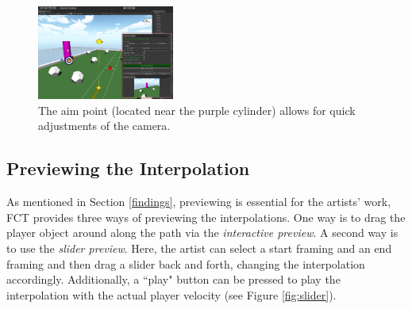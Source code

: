 
\begin{figure}[htbp]
\centering
\includegraphics[width=0.4\textwidth]{Pics/aimPoint}
\caption{The aim point (located near the purple cylinder) allows for quick adjustments of the camera.}
\label{fig:aimPoint}
\end{figure}


\subsection{Previewing the Interpolation}
As mentioned in Section \ref{findings}, previewing is essential for the artists' work, FCT provides three ways of previewing the interpolations. One way is to drag the player object around along the path via the \textit{interactive preview}. A second way is to use the \textit{slider preview}. Here, the artist can select a start framing and an end framing and then drag a slider back and forth, changing the interpolation accordingly. Additionally, a ``play" button can be pressed to play the interpolation with the actual player velocity (see Figure \ref{fig:slider}).

